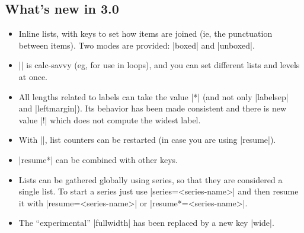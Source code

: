 \documentclass[a4paper]{ltxguide}
\begin{document}
\begin{enumerate}[leftmargin=*]
\begin{enumerate}[leftmargin=\parindent]
\begin{enumerate}[labelindent=\parindent,|\allowbreak
| leftmargin=*,|\allowbreak| label=\Roman*.,|\allowbreak
| widest=III,|\allowbreak| align=left]
\begin{enumerate}[label=\fbox{\arabic*}]

\subsection{What's new in 3.0}

\begin{itemize}
\item Inline lists, with keys to set how items are joined (ie, the
punctuation between items).  Two modes are provided: |boxed|  and
|unboxed|.

\item |\setlist| is \textsf{calc}-savvy (eg, for use in loops),
and you can set different lists and levels at once.  \item All lengths
related to labels can take the value |*| (and not only
|labelsep| and |leftmargin|).  Its behavior has been made
consistent and there is new value |!| which does not compute the
widest label.

\item With ||, list counters can be restarted (in
case you are using |resume|).

\item |resume*| can be combined with other keys.

\item Lists can be gathered globally using series, so that they are
considered a single list. To start a series just use
|series=<series-name>| and then resume it with |resume=<series-name>|
or |resume*=<series-name>|.

\item The ``experimental'' |fullwidth| has been replaced by a new key
|wide|.


\end{itemize}
\end{enumerate}
\end{enumerate}
\end{enumerate}
\end{enumerate}
\end{document}
